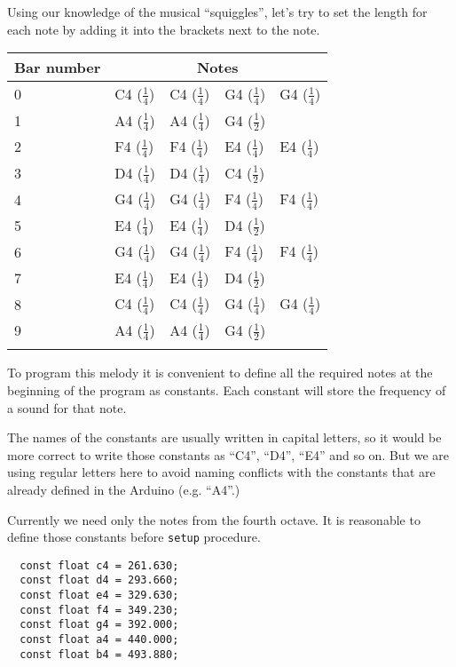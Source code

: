 \documentclass[../sparc.tex]{subfiles}
\begin{document}
Using our knowledge of the musical ``squiggles'', let's try to set the length
for each note by adding it into the brackets next to the note.

\begin{tabular}{p{2cm}|p{2cm}|p{2cm}|p{2cm}|p{2cm}}
  Bar number & \multicolumn{4}{c}{Notes} \\
  \hline \hline
  0 & C4 ($\frac{1}{4}$) & C4 ($\frac{1}{4}$) & G4 ($\frac{1}{4}$) & G4 ($\frac{1}{4}$) \\
  \hline
  1 & A4 ($\frac{1}{4}$) & A4 ($\frac{1}{4}$) & G4 ($\frac{1}{2}$) & \\
  \hline
  2 & F4 ($\frac{1}{4}$) & F4 ($\frac{1}{4}$) & E4 ($\frac{1}{4}$) & E4 ($\frac{1}{4}$) \\
  \hline
  3 & D4 ($\frac{1}{4}$) & D4 ($\frac{1}{4}$) & C4 ($\frac{1}{2}$) & \\
  \hline
  4 & G4 ($\frac{1}{4}$) & G4 ($\frac{1}{4}$) & F4 ($\frac{1}{4}$) & F4 ($\frac{1}{4}$) \\
  \hline
  5 & E4 ($\frac{1}{4}$) & E4 ($\frac{1}{4}$) & D4 ($\frac{1}{2}$) & \\
  \hline
  6 & G4 ($\frac{1}{4}$) & G4 ($\frac{1}{4}$) & F4 ($\frac{1}{4}$) & F4 ($\frac{1}{4}$) \\
  \hline
  7 & E4 ($\frac{1}{4}$) & E4 ($\frac{1}{4}$) & D4 ($\frac{1}{2}$) & \\
  \hline
  8 & C4 ($\frac{1}{4}$) & C4 ($\frac{1}{4}$) & G4 ($\frac{1}{4}$) & G4 ($\frac{1}{4}$) \\
  \hline
  9 & A4 ($\frac{1}{4}$) & A4 ($\frac{1}{4}$) & G4 ($\frac{1}{2}$) & \\
  \hline
  \label{table:twinkle-twinkle-little-star-notes-lengths}
\end{tabular}

To program this melody it is convenient to define all the required notes at the
beginning of the program as constants.  Each constant will store the frequency
of a sound for that note.

The names of the constants are usually written in capital letters, so it would
be more correct to write those constants as ``C4'', ``D4'', ``E4'' and so on.
But we are using regular letters here to avoid naming conflicts with the
constants that are already defined in the Arduino (e.g. ``A4''.)

Currently we need only the notes from the fourth octave.  It is reasonable to
define those constants before \texttt{setup} procedure.

\begin{verbatim}
  const float c4 = 261.630;
  const float d4 = 293.660;
  const float e4 = 329.630;
  const float f4 = 349.230;
  const float g4 = 392.000;
  const float a4 = 440.000;
  const float b4 = 493.880;
\end{verbatim}
\end{document}
